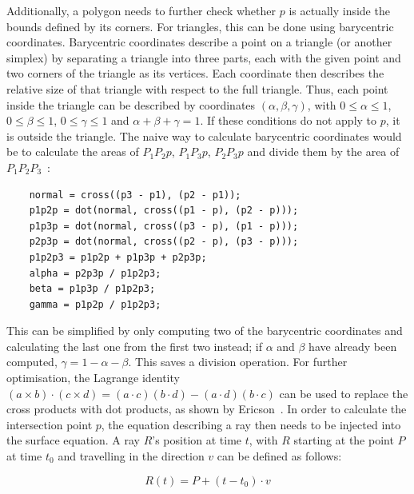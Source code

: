 Additionally, a polygon needs to further check whether \(p\) is actually inside the bounds defined by its corners.
For triangles, this can be done using barycentric coordinates.
\newline
Barycentric coordinates describe a point on a triangle (or another simplex) by separating a triangle into three parts,
each with the given point and two corners of the triangle as its vertices.
Each coordinate then describes the relative size of that triangle with respect to the full triangle.
\newline
Thus, each point inside the triangle can be described by coordinates \((\alpha, \beta, \gamma)\),
with \(0 \le \alpha \le 1\), \(0 \le \beta \le 1\), \(0 \le \gamma \le 1\) and \(\alpha + \beta + \gamma = 1\).
If these conditions do not apply to \(p\), it is outside the triangle.
\newline
The naive way to calculate barycentric coordinates would be to calculate the areas of \(P_1P_2p\), \(P_1P_3p\), \(P_2P_3p\) and
divide them by the area of \(P_1P_2P_3\)~\cite{SM09}:
\begin{verbatim}
    normal = cross((p3 - p1), (p2 - p1));
    p1p2p = dot(normal, cross((p1 - p), (p2 - p)));
    p1p3p = dot(normal, cross((p3 - p), (p1 - p)));
    p2p3p = dot(normal, cross((p2 - p), (p3 - p)));
    p1p2p3 = p1p2p + p1p3p + p2p3p;
    alpha = p2p3p / p1p2p3;
    beta = p1p3p / p1p2p3;
    gamma = p1p2p / p1p2p3;
\end{verbatim}
This can be simplified by only computing two of the barycentric coordinates
and calculating the last one from the first two instead; if \(\alpha\) and \(\beta\) have already been computed,
\(\gamma = 1 - \alpha - \beta\). This saves a division operation.
For further optimisation, the Lagrange identity \((a \times b) \cdot (c \times d) = (a \cdot c)(b \cdot d) - (a \cdot d)(b \cdot c)\)
can be used to replace the cross products with dot products, as shown by Ericson~\cite{Er04}.
\newline
In order to calculate the intersection point \(p\), the equation describing a ray then needs to be injected into the surface equation.
A ray \(R\)'s position at time \(t\), with \(R\) starting at the point \(P\) at time \(t_0\)
and travelling in the direction \(v\) can be defined as follows:

\begin{equation}\label{RayEq}
    R(t) = P + (t - t_0) \cdot v
\end{equation}

